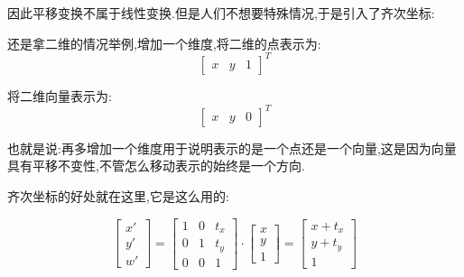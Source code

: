 \documentclass[UTF8,12pt]{ctexbook}
\begin{document}
{{{{{        因此平移变换不属于线性变换.但是人们不想要特殊情况,于是引入了齐次坐标:

        还是拿二维的情况举例,增加一个维度,将二维的点表示为:
        $$\begin{bmatrix}
            x & y & 1
          \end{bmatrix}^T$$

        将二维向量表示为:
        $$\begin{bmatrix}
            x & y & 0
          \end{bmatrix}^T$$

        也就是说:再多增加一个维度用于说明表示的是一个点还是一个向量,这是因为向量具有平移不变性,不管怎么移动表示的始终是一个方向.

        齐次坐标的好处就在这里,它是这么用的:

        $$\begin{bmatrix}
            x\prime \\
            y\prime \\
            w\prime
          \end{bmatrix}
          =
          \begin{bmatrix}
            1 & 0 & t_x \\
            0 & 1 & t_y \\
            0 & 0 & 1
          \end{bmatrix}
          \cdot
          \begin{bmatrix}
            x \\
            y \\
            1
          \end{bmatrix}
          =
          \begin{bmatrix}
            x + t_x \\
            y + t_y \\
            1
          \end{bmatrix}
        $$

}}}}}
\end{document}
